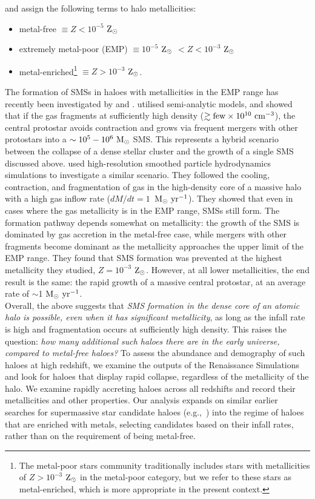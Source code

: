 \documentclass[twocolumn,iop,revtex4]{openjournal}
\newcommand{\msolaryrc} {$\rm{M_{\odot}~yr^{-1}}$}
\newcommand{\zsolar} {$\rm{Z_{\odot}}~$}
\newcommand{\zsolarc} {$\rm{Z_{\odot}}$}
\begin{document}
and assign the following terms to halo metallicities:
\begin{itemize}
\item metal-free $\equiv Z < 10^{-5}$ \zsolarc 
\item extremely metal-poor (EMP) $\equiv 10^{-5}$ \zsolar $< Z < 10^{-3}$ \zsolarc 
\item metal-enriched\footnote{The metal-poor stars community traditionally includes stars with
  metallicities of $Z > 10^{-3}$ \zsolar in the metal-poor category, but we refer to these stars as metal-enriched, which 
  is more appropriate in the present context.} $\equiv Z > 10^{-3}$ \zsolarc.
\end{itemize}
  The formation of SMSs in haloes with metallicities in the EMP range
  has recently been investigated by \cite{Tagawa_2020} and \cite{Chon_2020}. \cite{Tagawa_2020}  utilised semi-analytic models, and showed that if the gas fragments at sufficiently high density ($\gtrsim {\rm few}\times 10^{10}~{\rm cm^{-3}}$), the central protostar avoids contraction and  grows via frequent mergers with other protostars into a $\sim 10^5-10^6~{\rm M_\odot}$ SMS. This represents a hybrid scenario between the collapse of a dense stellar cluster and the growth of a single SMS discussed above.
   \cite{Chon_2020} used high-resolution smoothed particle
  hydrodynamics simulations to investigate a similar scenario. They followed the cooling, contraction, and fragmentation of gas in the high-density core of a massive halo with a high gas inflow rate ($dM/dt=1$~\msolaryrc).  They showed that even in cases where the gas metallicity is in the EMP range, SMSs still form. The formation pathway depends somewhat on metallicity: the growth of the SMS is dominated by gas accretion in the metal-free case, while mergers with other fragments become dominant as the metallicity approaches the upper limit of the EMP range. They found that SMS formation was prevented at the highest metallicity they studied, $Z=10^{-3}$ \zsolarc. However, at all lower metallicities, the end result is the same: the rapid growth of a massive central protostar, at an average rate of $\sim$1 \msolaryrc.\\
  \indent Overall, the above suggests that {\em SMS formation in the dense core of an atomic halo is possible,
    even when it has significant metallicity}, as long as the infall rate is high and fragmentation occurs at sufficiently high density.
This raises the question: {\em how many additional such haloes there are in the early universe, compared to metal-free haloes?}
To assess the abundance and demography of such haloes at high redshift, we examine the outputs of the Renaissance Simulations
and look for haloes that display rapid collapse, regardless of the metallicity of the halo.
We examine rapidly accreting haloes across all redshifts and record their metallicities and other properties.
Our analysis expands on similar earlier searches for supermassive star candidate haloes
(e.g.,~\citealt{Habouzit_2016,Tremmel_2017,Dunn_2018,Wise_2019,Regan_2020}) into the regime of haloes that are enriched with
metals, selecting candidates based on their infall rates, rather than on the requirement of being metal-free.
\end{document}
